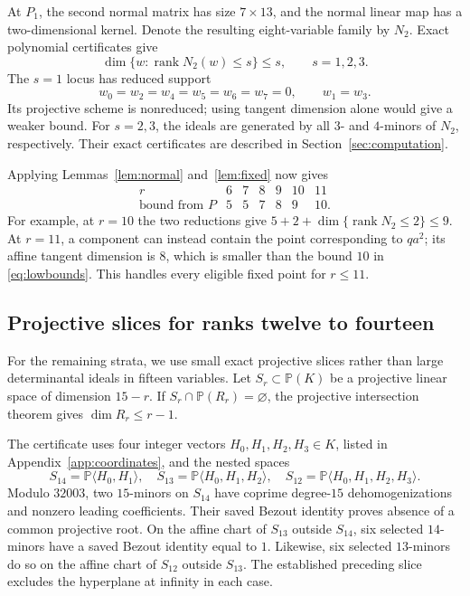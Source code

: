 \documentclass[11pt]{amsart}
\theoremstyle{remark}
\newcommand{\PP}{\mathbb P}
\newcommand{\rank}{\operatorname{rank}}
\begin{document}
At $P_1$, the second normal matrix has size $7\times13$, and the normal linear map has a two-dimensional kernel. Denote the resulting eight-variable family by $N_2$. Exact polynomial certificates give
\begin{equation}\label{eq:n2dims}
 \dim\{w:\rank N_2(w)\leq s\}\leq s,
 \qquad s=1,2,3.
\end{equation}
The $s=1$ locus has reduced support
\[
 w_0=w_2=w_4=w_5=w_6=w_7=0,\qquad w_1=w_3.
\]
Its projective scheme is nonreduced; using tangent dimension alone would give a weaker bound. For $s=2,3$, the ideals are generated by all $3$- and $4$-minors of $N_2$, respectively. Their exact certificates are described in Section~\ref{sec:computation}.

Applying Lemmas~\ref{lem:normal} and~\ref{lem:fixed} now gives
\begin{equation}\label{eq:lowbounds}
 \begin{array}{c|rrrrrr}
 r&6&7&8&9&10&11\\ \hline
 \text{bound from }P&5&5&7&8&9&10.
 \end{array}
\end{equation}
For example, at $r=10$ the two reductions give $5+2+\dim\{\rank N_2\leq2\}\leq9$. At $r=11$, a component can instead contain the point corresponding to $qa^2$; its affine tangent dimension is $8$, which is smaller than the bound $10$ in \eqref{eq:lowbounds}. This handles every eligible fixed point for $r\leq11$.

\subsection{Projective slices for ranks twelve to fourteen}
For the remaining strata, we use small exact projective slices rather than large determinantal ideals in fifteen variables. Let $S_r\subset\PP(K)$ be a projective linear space of dimension $15-r$. If $S_r\cap\PP(R_r)=\varnothing$, the projective intersection theorem gives $\dim R_r\leq r-1$.

The certificate uses four integer vectors $H_0,H_1,H_2,H_3\in K$, listed in Appendix~\ref{app:coordinates}, and the nested spaces
\[
 S_{14}=\PP\langle H_0,H_1\rangle,\quad
 S_{13}=\PP\langle H_0,H_1,H_2\rangle,\quad
 S_{12}=\PP\langle H_0,H_1,H_2,H_3\rangle.
\]
Modulo $32003$, two $15$-minors on $S_{14}$ have coprime degree-$15$ dehomogenizations and nonzero leading coefficients. Their saved Bezout identity proves absence of a common projective root. On the affine chart of $S_{13}$ outside $S_{14}$, six selected $14$-minors have a saved Bezout identity equal to $1$. Likewise, six selected $13$-minors do so on the affine chart of $S_{12}$ outside $S_{13}$. The established preceding slice excludes the hyperplane at infinity in each case.
\end{document}
